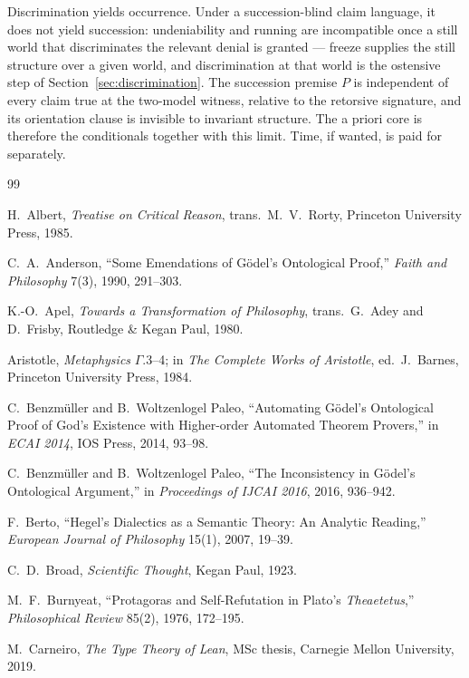 \documentclass[11pt]{article}
\begin{document}
Discrimination yields occurrence. Under a succession-blind claim language, it
does not yield succession: undeniability and running are incompatible once a
still world that discriminates the relevant denial is granted --- freeze
supplies the still structure over a given world, and discrimination at that
world is the ostensive step of Section~\ref{sec:discrimination}. The succession
premise \(P\) is independent of every claim true at the two-model witness,
relative to the retorsive signature, and its orientation clause is invisible to
invariant structure. The a priori core is therefore the conditionals together
with this limit. Time, if wanted, is paid for separately.

\begin{thebibliography}{99}

 H.\ Albert, \emph{Treatise on Critical Reason}, trans.\
M.\ V.\ Rorty, Princeton University Press, 1985.

 C.\ A.\ Anderson, ``Some Emendations of G\"odel's
Ontological Proof,'' \emph{Faith and Philosophy} 7(3), 1990, 291--303.

 K.-O.\ Apel, \emph{Towards a Transformation of Philosophy},
trans.\ G.\ Adey and D.\ Frisby, Routledge \& Kegan Paul, 1980.

 Aristotle, \emph{Metaphysics} \(\Gamma\).3--4; in
\emph{The Complete Works of Aristotle}, ed.\ J.\ Barnes, Princeton University
Press, 1984.

 C.\ Benzm\"uller and B.\ Woltzenlogel Paleo,
``Automating G\"odel's Ontological Proof of God's Existence with Higher-order
Automated Theorem Provers,'' in \emph{ECAI 2014}, IOS Press, 2014, 93--98.

 C.\ Benzm\"uller and B.\ Woltzenlogel Paleo, ``The
Inconsistency in G\"odel's Ontological Argument,'' in \emph{Proceedings of
IJCAI 2016}, 2016, 936--942.

 F.\ Berto, ``Hegel's Dialectics as a Semantic Theory: An
Analytic Reading,'' \emph{European Journal of Philosophy} 15(1), 2007, 19--39.

 C.\ D.\ Broad, \emph{Scientific Thought}, Kegan Paul, 1923.

 M.\ F.\ Burnyeat, ``Protagoras and Self-Refutation in
Plato's \emph{Theaetetus},'' \emph{Philosophical Review} 85(2), 1976, 172--195.

 M.\ Carneiro, \emph{The Type Theory of Lean}, MSc
thesis, Carnegie Mellon University, 2019.


\end{thebibliography}
\end{document}
